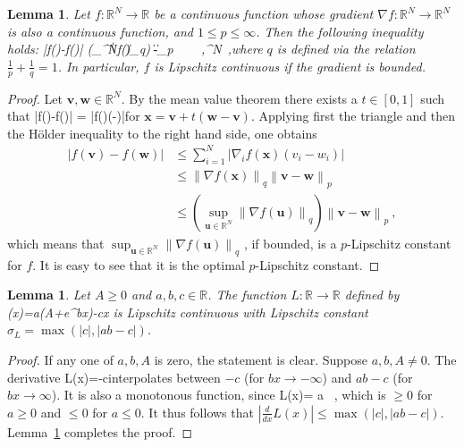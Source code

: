 \documentclass[12pt]{article}
\theoremstyle{plain}
\newtheorem{lemma}[theorem]{Lemma}
\theoremstyle{definition}
\numberwithin{equation}{section}
\numberwithin{theorem}{section}
\def\be#1\ee{\begin{equation}#1\end{equation}}
\renewcommand{\vec}[1]{\mathbf{#1}}
\begin{document}
\begin{lemma}\label{pLipschitz}
Let $f:\mathbb{R}^N\rightarrow\mathbb{R}$ be a continuous function whose gradient $\nabla f:\mathbb{R}^N\rightarrow\mathbb{R}^N$ is also a continuous function, and $1\leq p \leq\infty$. Then the following inequality holds:
\be\left|f(\vec{v})-f(\vec{w})\right| \leq \left(\sup_{\vec{u}\in{}^N}\left\|\nabla f(\vec{u})\right\|_q\right) \left\|\vec{v}-\vec{w}\right\|_p \hspace{1cm} \ ~~ \vec{v},\vec{w}\in{}^N\ ,\ee where $q$ is defined via the relation $\frac{1}{p}+\frac{1}{q}=1$. In particular, $f$ is Lipschitz continuous if the gradient is bounded.
\end{lemma}

\begin{proof}
Let $\vec{v},\vec{w}\in\mathbb{R}^N$. By the mean value theorem there exists a $t\in[0,1]$ such that \be\left|f(\vec{v})-f(\vec{w})\right| = \left|\nabla f(\vec{x})\cdot(\vec{v}-\vec{w})\right|\ee for $\vec{x}=\vec{v}+t(\vec{w}-\vec{v})$. Applying first the triangle and then the H\"older inequality to the right hand side, one obtains
\begin{align}
\left|f(\vec{v})-f(\vec{w})\right| &\leq  \sum_{i=1}^N\left|\nabla_i f(\vec{x})(v_i-w_i)\right| \nonumber\\
&\leq \left\|\nabla f(\vec{x})\right\|_q \left\|\vec{v}-\vec{w}\right\|_p \nonumber\\
&\leq \left(\sup_{\vec{u}\in\mathbb{R}^N}\left\|\nabla f(\vec{u})\right\|_q\right) \left\|\vec{v}-\vec{w}\right\|_p \ ,
\end{align}
which means that $\sup_{\vec{u}\in\mathbb{R}^N}\left\|\nabla f(\vec{u})\right\|_q$ , if bounded, is a $p$-Lipschitz constant for $f$. It is easy to see that it is the optimal $p$-Lipschitz constant.
\end{proof}


\begin{lemma} \label{StandardLfunctionIsLipschitz}
Let $A\ge 0$ and $a,b,c\in\mathbb{R}$. The function 
$L:\mathbb{R}\rightarrow\mathbb{R}$ defined by 
\be
L(x)=a\cdot\log\left(A+e^{bx}\right)-cx
\ee is Lipschitz continuous with Lipschitz constant $\sigma_L=\max(|c|,|ab-c|)$.
\end{lemma}

\begin{proof}
If any one of $a,b,A$ is zero, the statement is clear. Suppose $a,b,A\neq0$.
The derivative \be\frac{d}{dx}L(x)=-c\ee interpolates between $-c$ (for $bx\rightarrow -\infty$) and $ab-c$ (for $bx\rightarrow \infty$). It is also a monotonous function, since 
\be\frac{d^2}{dx^2}L(x)= a \cdot {}\ ,
\ee
which is $\ge 0$ 
for $a \ge 0$ and $\le 0$ for $a \le 0$.
It thus follows that $\left|\frac{d}{dx}L(x)\right|\leq\max(|c|,|ab-c|)$.
Lemma~\ref{pLipschitz} completes the proof.
\end{proof}
\end{document}
